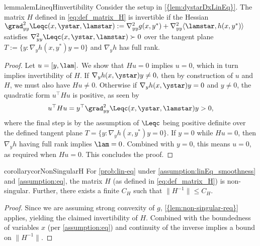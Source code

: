 \begin{restatable}{lemma}{lemLineqHinvertibility}\label{lem:non-singular-req} 
Consider the setup in \cref{{lem:dystarDxLinEq}}. The matrix $H$ defined in \cref{eq:def_matrix_H}  is invertible if
the Hessian $\grad_{yy}^{2}\Leqc(x,\ystar,\lamstar):=\nabla^2_{yy} g(x, y^*) +\nabla^2_{yy}\langle\lamstar,  h(x, y^*)\rangle$
satisfies $\nabla_{yy}^{2}\Leqc(x,\ystar,\lamstar)\succ0$ over
the tangent plane $T:=\{y:\nabla_y h(x,y^{*})y=0\}$ and $\nabla_y h$ has full
rank.
\end{restatable}
\begin{proof}
Let $u=[y,\lam].$ We show that $Hu=0$ implies $u=0$, which in turn implies invertibility of $H$. If $\nabla_y h(x,\ystar)y\neq0,$ then by construction of $u$ and $H$, we must also have $Hu\neq0$. Otherwise if $\nabla_y h(x,\ystar)y=0$ and $y\neq0$,
the quadratic form $u^{\top}Hu$ is positive, as seen by 
\[
u^{\top}Hu=y^{\top}\grad^2_{yy}\Leqc(x,\ystar,\lamstar)y>0,
\] where the final step is by the assumption of $\Leqc$ being positive definite over the defined tangent plane $T=\{y:\nabla_y h(x,y^{*})y=0\}$. 
If $y=0$ while $Hu=0$, then $\nabla_y h$ having full rank implies $\lam=0$. Combined with $y=0$, this means $u=0$, as required when $Hu=0$. This concludes the proof. 
\end{proof}

\begin{restatable}{corollary}{corNonSingularH}\label{cor:nonsingularH}
For \cref{prob:lin-eq} under \cref{assumption:linEq_smoothness} and \cref{assumption:eq},
 the matrix $H$  (as defined in \cref{eq:def_matrix_H}) is non-singular. Further, there exists a finite $C_H$ such that $\|H^{-1}\|\leq C_H$. 
\end{restatable}
\begin{proof} Since we are assuming strong convexity of $g$, \cref{{lem:non-singular-req}} applies, yielding the claimed invertibility of $H$. Combined with the boundedness of variables $x$ (per \cref{assumption:eq}) 
and continuity of the inverse implies a bound on $\|H^{-1}\|$. 
\end{proof}


